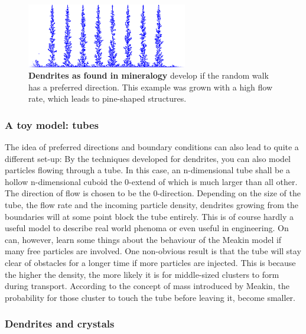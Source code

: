 \documentclass[twocolumn,10pt]{scrartcl}
\begin{document}
                \begin{figure}
                    \center
                    \includegraphics[width=7cm]{img/dendrites.png}
                    \caption[Dendrites as found in mineralogy]
                        {\small\textbf{Dendrites as found in mineralogy} develop if the random walk has a preferred
                        direction. This example was grown with a high flow rate, which leads to pine-shaped
                        structures.}
                    \label{fig-dendrites}
                \end{figure}

            \subsubsection{A toy model: tubes}
                The idea of preferred directions and boundary conditions can also lead to quite a different set-up:
                By the techniques developed for dendrites, you can also model particles flowing through a tube. In
                this case, an n-dimensional tube shall be a hollow n-dimensional cuboid the 0-extend of which is much
                larger than all other. The direction of flow is chosen to be the 0-direction. Depending on the size of
                the tube, the flow rate and the incoming particle density, dendrites growing from the boundaries will
                at some point block the tube entirely. This is of course hardly a useful model to describe real world
                phenoma or even useful in engineering. On can, however, learn some things about the behaviour of the
                Meakin model if many free particles are involved. One non-obvious result is that the tube will stay
                clear of obstacles for a longer time if more particles are injected. This is because the higher the
                density, the more likely it is for middle-sized clusters to form during transport. According to the
                concept of mass introduced by Meakin, the probability for those cluster to touch the tube before
                leaving it, become smaller.

            \subsubsection{Dendrites and crystals}
\end{document}
